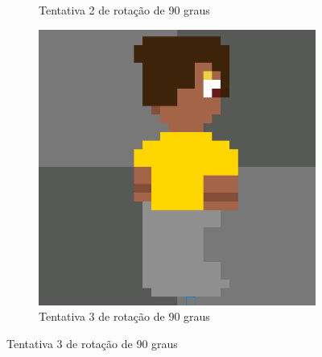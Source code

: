 \begin{figure}[htbp]
\begin{subfigure}{0.35\linewidth}
        \caption{\small Tentativa 2 de rotação de 90 graus}
        \label{fig:pixelLabRot8c}
    \end{subfigure}
    \begin{subfigure}{0.35\linewidth}
        \includegraphics[width=1\linewidth]{figs/pixelLab/dia2/rot45fix3res3.PNG}
        \caption{\small Tentativa 3 de rotação de 90 graus}
        \label{fig:pixelLabRot8d}
    \end{subfigure}
\end{figure}


